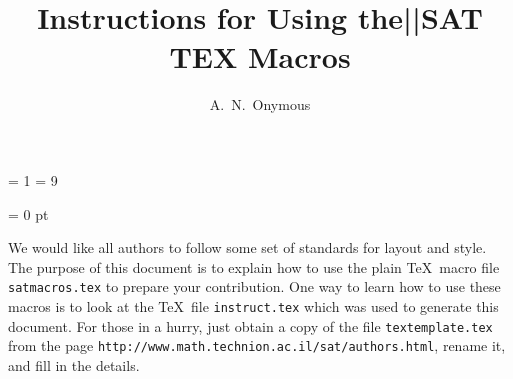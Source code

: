 
%
%


\def\updated{03jun06}

= 1
= 9


\overfullrule = 0 pt

\def\presect{} %


\title{Instructions for Using the||SAT TEX Macros}
\author{A.~N.~Onymous}

\def\shorttitle{Instructions}
\def\shortauthor{A.~N.~Onymous}
\def\mscnumbers{41-02}
\def\keywords{words to the wise}


\def\backslash{{\tt \char'134}}
\def\co{{\cal O}}
\def\cP{{\cal P}}
\def\ct{{\cal T}}
\def\ctil{\tilde{\cal T}}
\def\lb{\char'173}
\def\rb{\char'175}
\def\oln{\co(n \log(n))}
\def\tb#1{{\tt \backslash #1}}
\def\Tex{{\TeX~}}




We would like all authors to follow some set of standards for
layout and style.  The purpose of this document is to explain how
to use the plain \Tex macro file {\tt satmacros.tex} to prepare
your contribution.  One way to learn how to use these macros is to look at
the \Tex file {\tt instruct.tex} which was used to generate this document.
For those in a hurry, just obtain a copy of the file {\tt textemplate.tex}
from the page
{\tt http://www.math.technion.ac.il/sat/authors.html}, rename it, and fill in
the details.

